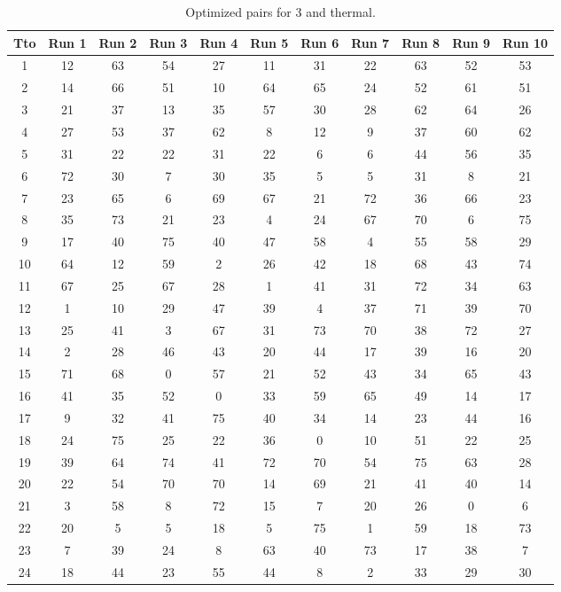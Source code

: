 \begin{table}
  \centering
  \scriptsize
  \caption{Optimized pairs for 3 and thermal.}
  \label{tab_pairs}
\begin{tabular}{c c c c c c c c c c c }
\hline
Tto & Run 1 & Run 2 & Run 3 & Run 4 & Run 5 & Run 6 & Run 7 & Run 8 & Run 9 & Run 10 \\
\hline
1 & 12 & 63 & 54 & 27 & 11 & 31 & 22 & 63 & 52 & 53 \\
2 & 14 & 66 & 51 & 10 & 64 & 65 & 24 & 52 & 61 & 51 \\
3 & 21 & 37 & 13 & 35 & 57 & 30 & 28 & 62 & 64 & 26 \\
4 & 27 & 53 & 37 & 62 & 8 & 12 & 9 & 37 & 60 & 62 \\
5 & 31 & 22 & 22 & 31 & 22 & 6 & 6 & 44 & 56 & 35 \\
6 & 72 & 30 & 7 & 30 & 35 & 5 & 5 & 31 & 8 & 21 \\
7 & 23 & 65 & 6 & 69 & 67 & 21 & 72 & 36 & 66 & 23 \\
8 & 35 & 73 & 21 & 23 & 4 & 24 & 67 & 70 & 6 & 75 \\
9 & 17 & 40 & 75 & 40 & 47 & 58 & 4 & 55 & 58 & 29 \\
10 & 64 & 12 & 59 & 2 & 26 & 42 & 18 & 68 & 43 & 74 \\
11 & 67 & 25 & 67 & 28 & 1 & 41 & 31 & 72 & 34 & 63 \\
12 & 1 & 10 & 29 & 47 & 39 & 4 & 37 & 71 & 39 & 70 \\
13 & 25 & 41 & 3 & 67 & 31 & 73 & 70 & 38 & 72 & 27 \\
14 & 2 & 28 & 46 & 43 & 20 & 44 & 17 & 39 & 16 & 20 \\
15 & 71 & 68 & 0 & 57 & 21 & 52 & 43 & 34 & 65 & 43 \\
16 & 41 & 35 & 52 & 0 & 33 & 59 & 65 & 49 & 14 & 17 \\
17 & 9 & 32 & 41 & 75 & 40 & 34 & 14 & 23 & 44 & 16 \\
18 & 24 & 75 & 25 & 22 & 36 & 0 & 10 & 51 & 22 & 25 \\
19 & 39 & 64 & 74 & 41 & 72 & 70 & 54 & 75 & 63 & 28 \\
20 & 22 & 54 & 70 & 70 & 14 & 69 & 21 & 41 & 40 & 14 \\
21 & 3 & 58 & 8 & 72 & 15 & 7 & 20 & 26 & 0 & 6 \\
22 & 20 & 5 & 5 & 18 & 5 & 75 & 1 & 59 & 18 & 73 \\
23 & 7 & 39 & 24 & 8 & 63 & 40 & 73 & 17 & 38 & 7 \\
24 & 18 & 44 & 23 & 55 & 44 & 8 & 2 & 33 & 29 & 30 \\

\end{tabular}
\end{table}
